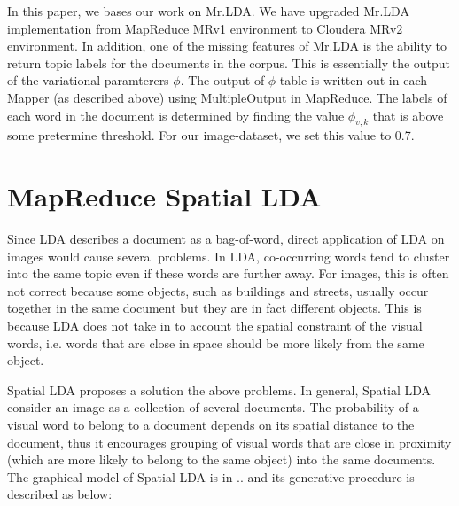 \documentclass{acm_proc_article-sp}
\begin{document}
In this paper, we bases our work on Mr.LDA. We have upgraded Mr.LDA implementation from MapReduce MRv1 environment to Cloudera MRv2 environment. In addition, one of the missing features of Mr.LDA is the ability to return topic labels for the documents in the corpus. This is essentially the output of the variational paramterers $\phi$. The output of $\phi$-table is written out in each Mapper (as described above) using MultipleOutput in MapReduce. The labels of each word in the document is determined by finding the value $\phi_{v,k}$ that is above some pretermine threshold. For our image-dataset, we set this value to 0.7.

\section{MapReduce Spatial LDA}

Since LDA describes a document as a bag-of-word, direct application of LDA on images would cause several problems. In LDA, co-occurring words tend to cluster into the same topic even if these words are further away. For images, this is often not correct because some objects, such as buildings and streets, usually occur together in the same document but they are in fact different objects. This is because LDA does not take in to account the spatial constraint of the visual words, i.e. words that are close in space should be more likely from the same object.

Spatial LDA proposes a solution the above problems. In general, Spatial LDA consider an image as a collection of several documents. The probability of a visual word to belong to a document depends on its spatial distance to the document, thus it encourages grouping of visual words that are close in proximity (which are more likely to belong to the same object) into the same documents. The graphical model of Spatial LDA is in .. and its generative procedure is described as below:
\end{document}
